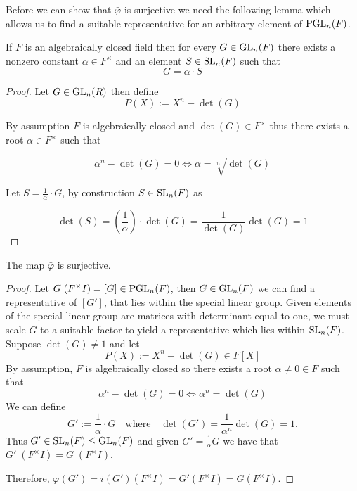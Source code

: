 Before we can show that $\bar{\varphi}$ is surjective we need the following lemma which allows us to find a suitable representative for an arbitrary element of $\operatorname{PGL}_n(F)$.

\begin{lemma}
\label{exists_SL_eq_scaled_GL_of_IsAlgClosed}
\leanok
If $F$ is an algebraically closed field then for every $G \in \operatorname{GL}_n(F)$ there exists a nonzero constant $\alpha \in F^\times$ and an element $S \in \operatorname{SL}_n(F)$ such that 
\begin{equation*}
    G = \alpha \cdot S
\end{equation*}
\end{lemma}

\begin{proof}
Let $G \in \operatorname{GL}_n(R)$ then define
\begin{equation*}
    P(X) := X^n - \det(G)
\end{equation*}

By assumption $F$ is algebraically closed and $\det(G) \in F^\times$ thus there exists a root $\alpha \in F^\times$ such that 

\begin{equation*}
    \alpha^n - \det(G) = 0 \iff \alpha = \sqrt[n]{\det(G)} 
\end{equation*}

Let $S = \frac{1}{\alpha} \cdot G$, by construction $S \in \operatorname{SL}_n(F)$ as 

\begin{equation*}
    \det(S) = \left(\frac{1}{\alpha}\right) \cdot \det(G) = \frac{1}{\det(G)} \det(G) = 1
\end{equation*}
\end{proof}

\begin{lemma}
\label{Surjective_PSL_monoidHom_PGL}
\leanok
    The map $\bar{\varphi}$ is surjective.
\end{lemma}

\begin{proof}
    Let $G \; (F^\times I) = [G] \in \operatorname{PGL}_n(F)$, then $G \in \operatorname{GL}_n(F)$ we can find a representative of $[G']$, that lies within the special linear group.
    Given elements of the special linear group are matrices with determinant equal to one, we must scale $G$ to a suitable factor to yield a representative which lies within $\operatorname{SL}_n(F)$. Suppose $\det(G) \ne 1$ and let
    \[
    P(X) := X^n - \det(G) \in F[X]
    \]
    By assumption, $F$ is algebraically closed so there exists a root $\alpha \ne 0\in F$ such that 
    \[
    \alpha^n - \det(G) = 0 \iff \alpha^n = \det(G)
    \]
    We can define
    \[
    G' := \frac{1}{\alpha} \cdot G \quad \text{where} \quad \det(G') = \frac{1}{\alpha^n} \det(G) = 1.
    \]
    Thus $G' \in \operatorname{SL}_n(F) \leq \operatorname{GL}_n(F)$ and given $G' = \frac{1}{\alpha} G$ we have that $G'  \; (F^\times I) = G \; (F^\times I)$.
    
    Therefore, $\varphi(G') = i(G') (F^\times I) = G' (F^\times I) = G (F^\times I)$.
\end{proof}

